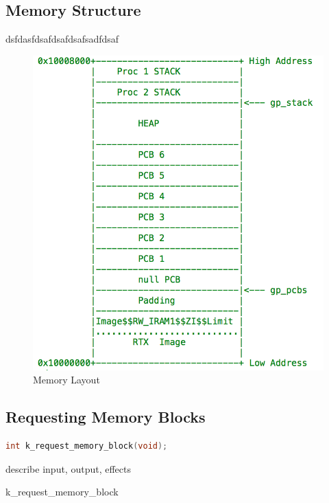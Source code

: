 \documentclass[12pt]{report}
\begin{document}
\subsection{Memory Structure}

dsfdasfdsafdsafdsafsadfdsaf

\begin{figure}[h!]
	\includegraphics{memory.png}
\caption{Memory Layout}

\end{figure}

\subsection{Requesting Memory Blocks}

\begin{minipage}{\textwidth}
\begin{lstlisting}[language=C, frame=single]
int k_request_memory_block(void);
\end{lstlisting}
\end{minipage}

describe input, output, effects

\begin{algorithm}
  \caption{k_request_memory_block}
  \begin{algorithmic}[1]
	  \EndWhile
    \EndProcedure
  \end{algorithmic}
\end{algorithm}
\end{document}
